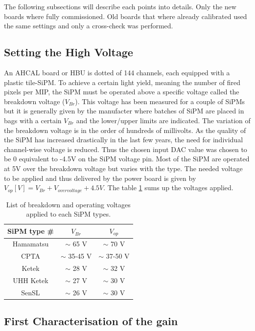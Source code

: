 The following subsections will describe each points into details. Only the new boards where fully commissioned. Old boards that where already calibrated used the same settings and only a cross-check was performed.

\subsection{Setting the High Voltage}

An AHCAL board or HBU is dotted of 144 channels, each equipped with a plastic tile-SiPM. To achieve a certain light yield, meaning the number of fired pixels per MIP, the SiPM must be operated above a specific voltage called the breakdown voltage ($V_{Br}$). This voltage has been measured for a couple of SiPMs but it is generally given by the manufacter where batches of SiPM are placed in bags with a certain $V_{Br}$ and the lower/upper limits are indicated. The variation of the breakdown voltage is in the order of hundreds of millivolts. As the quality of the SiPM has increased drastically in the last few years, the need for individual channel-wise voltage is reduced. Thus the chosen input DAC value was chosen to be 0 equivalent to -4.5V on the SiPM voltage pin. Most of the SiPM are operated at 5V over the breakdown voltage but varies with the type. The needed voltage to be applied and thus delivered by the power board is given by $V_{op} [V] = V_{Br} + V_{overvoltage} + 4.5V$. The table \ref{table:Voltage_SiPM} sums up the voltages applied.

\begin{table}[htb!]
  \centering
  \caption{List of breakdown and operating voltages applied to each SiPM types.}
  \label{table:Voltage_SiPM}
  \begin{tabular}{@{} ccc @{}}
    \hline
    SiPM type \# & $V_{Br}$ & $V_{op}$ \\
    \hline
    Hamamatsu & $\sim$ 65 V & $\sim$ 70 V \\
    CPTA & $\sim$ 35-45 V & $\sim$ 37-50 V \\
    Ketek & $\sim$ 28 V & $\sim$ 32 V \\
    UHH Ketek & $\sim$ 27 V & $\sim$ 30 V \\
    SenSL & $\sim$ 26 V & $\sim$ 30 V \\
    \hline
  \end{tabular}
\end{table}

\subsection{First Characterisation of the gain}

